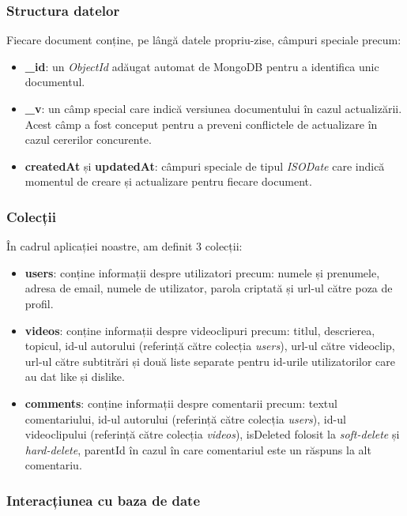 \subsubsection{Structura datelor}

\par
Fiecare document conține, pe lângă datele propriu-zise, câmpuri speciale precum:
\begin{itemize}
    \item \textbf{\_id}: un \textit{ObjectId} adăugat automat de MongoDB pentru a identifica unic documentul.
    \item \textbf{\_v}: un câmp special care indică versiunea documentului în cazul actualizării. Acest
    câmp a fost conceput pentru a preveni conflictele de actualizare în cazul cererilor concurente.
    \item \textbf{createdAt} și \textbf{updatedAt}: câmpuri speciale de tipul \textit{ISODate} care
    indică momentul de creare și actualizare pentru fiecare document.
\end{itemize}

\subsubsection{Colecții}

\par
În cadrul aplicației noastre, am definit 3 colecții:
\begin{itemize}
    \item \textbf{users}: conține informații despre utilizatori precum: numele și prenumele, adresa de
    email, numele de utilizator, parola criptată și url-ul către poza de profil.
    \item \textbf{videos}: conține informații despre videoclipuri precum: titlul, descrierea, topicul,
    id-ul autorului (referință către colecția \textit{users}), url-ul către videoclip, url-ul către
    subtitrări și două liste separate pentru id-urile utilizatorilor care au dat like și dislike.
    \item \textbf{comments}: conține informații despre comentarii precum: textul comentariului, 
    id-ul autorului (referință către colecția \textit{users}), id-ul videoclipului (referință către
    colecția \textit{videos}), isDeleted folosit la \textit{soft-delete} și \textit{hard-delete}, 
    parentId în cazul în care comentariul este un răspuns la alt comentariu.
\end{itemize}

\subsubsection{Interacțiunea cu baza de date}

